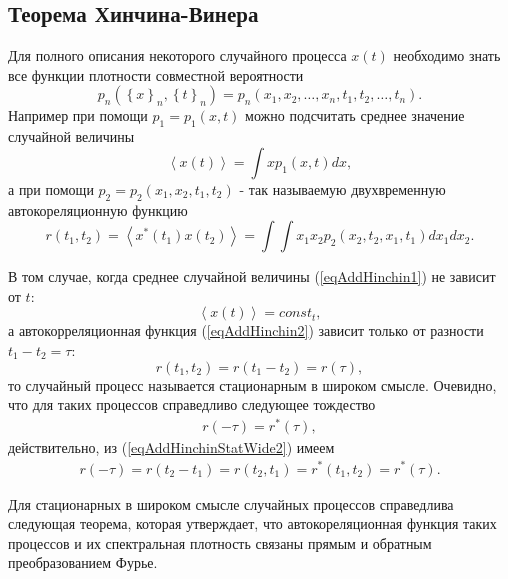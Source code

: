 \subsection{Теорема Хинчина-Винера}
\label{AddHinchin}
Для полного описания некоторого случайного процесса $x\left(t\right)$
необходимо знать все функции плотности совместной вероятности
\[
p_n\left(\left\{x\right\}_n,\left\{t\right\}_n\right) = 
p_n\left(x_1,x_2,\dots,x_n,t_1,t_2,\dots,t_n\right).
\] 
Например при помощи $p_1 = p_1\left(x,t\right)$ можно подсчитать среднее 
значение случайной величины
\begin{equation}
\left<x\left(t\right)\right> = \int x p_1\left(x,t\right) dx,
\label{eqAddHinchin1}
\end{equation}
а при помощи $p_2 = p_2\left(x_1,x_2,t_1,t_2\right)$ - так называемую
двухвременную автокореляционную функцию  
\begin{equation}
r\left(t_1, t_2\right) = \left<x^{*}\left(t_1\right) x\left(t_2\right)\right> = \int
\int x_1 x_2 p_2\left(x_2,t_2,x_1,t_1\right)dx_1 dx_2.
\label{eqAddHinchin2}
\end{equation}

В том случае, когда среднее случайной величины (\ref{eqAddHinchin1}) не
зависит от $t$:
\begin{equation}
\left<x\left(t\right)\right> = const_t,
\label{eqAddHinchinStatWide1}
\end{equation}
а автокорреляционная функция (\ref{eqAddHinchin2}) зависит только от
разности $t_1 - t_2 = \tau$:
\begin{equation}
r\left(t_1, t_2\right) = r\left(t_1 - t_2\right) = r\left(\tau\right),
\label{eqAddHinchinStatWide2}
\end{equation}
то случайный процесс называется стационарным в широком
смысле. Очевидно, что для таких процессов справедливо следующее
тождество
\begin{eqnarray}
r\left(- \tau\right) = r^{*}\left(\tau\right),
\label{eqAddHinchinStatWide3}
\end{eqnarray}
действительно, из (\ref{eqAddHinchinStatWide2}) имеем
\begin{eqnarray}
r\left(- \tau\right) = r\left(t_2 - t_1\right) = r\left(t_2,
t_1\right) = r^{*}\left(t_1, t_2\right) = r^{*}\left(\tau\right).
\nonumber
\end{eqnarray}


Для стационарных в широком смысле случайных процессов справедлива
следующая теорема, которая утверждает, что автокореляционная функция
таких процессов и их спектральная плотность связаны прямым и обратным
преобразованием Фурье.


